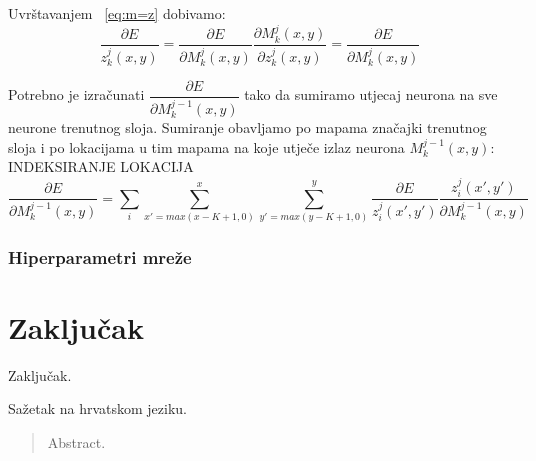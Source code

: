 \documentclass[times, utf8, zavrsni]{fer}
\begin{document}
Uvrštavanjem ~\ref{eq:m=z} dobivamo:
\begin{equation}
\dfrac{\partial E}{z^j_k (x, y)} = \dfrac{\partial E}{\partial M^j_k (x, y)} \dfrac{\partial M^j_k (x, y)}{\partial z^j_k (x, y)} = \dfrac{\partial E}{\partial M^j_k (x, y)}
\end{equation}

Potrebno je izračunati  $\dfrac{\partial E}{\partial M^{j-1}_k (x, y)}$ tako da sumiramo utjecaj neurona na sve neurone trenutnog sloja. Sumiranje obavljamo po mapama značajki trenutnog sloja i po lokacijama u tim mapama na koje utječe izlaz neurona $M^{j-1}_k (x, y)$: INDEKSIRANJE LOKACIJA
\begin{equation}
\dfrac{\partial E}{\partial M^{j-1}_k (x, y)} = \sum_{i} \sum_{x'=max(x-K+1, 0)}^{x} \sum_{y'=max(y-K+1, 0)}^{y} \dfrac{\partial E}{z^j_{i} (x', y')} \dfrac{z^j_{i} (x', y')}{\partial M^{j-1}_k (x, y)}
\end{equation}


\subsection{Hiperparametri mreže}




\chapter{Zaključak}
Zaključak.




\begin{sazetak}
Sažetak na hrvatskom jeziku.

\end{sazetak}

\begin{abstract}
Abstract.

\end{abstract}
\end{document}
